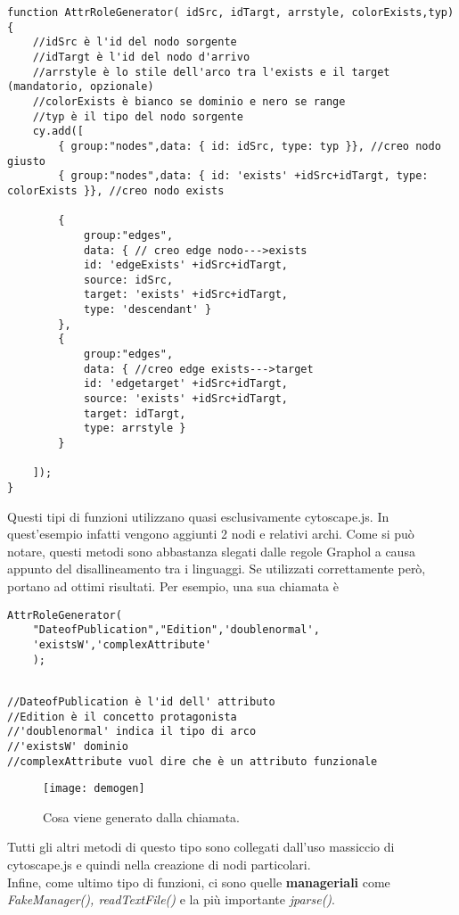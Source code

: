 \documentclass[Lau,binding=0.6cm]{sapthesis}
\begin{document}
\begin{verbatim}
function AttrRoleGenerator( idSrc, idTargt, arrstyle, colorExists,typ){ 
	//idSrc è l'id del nodo sorgente
	//idTargt è l'id del nodo d'arrivo
	//arrstyle è lo stile dell'arco tra l'exists e il target (mandatorio, opzionale)
	//colorExists è bianco se dominio e nero se range 
	//typ è il tipo del nodo sorgente
    cy.add([
        { group:"nodes",data: { id: idSrc, type: typ }}, //creo nodo giusto
        { group:"nodes",data: { id: 'exists' +idSrc+idTargt, type: colorExists }}, //creo nodo exists

        {   
            group:"edges",
            data: { // creo edge nodo--->exists
            id: 'edgeExists' +idSrc+idTargt, 
            source: idSrc,
            target: 'exists' +idSrc+idTargt,
            type: 'descendant' } 
        },
        { 
            group:"edges",                    
            data: { //creo edge exists--->target
            id: 'edgetarget' +idSrc+idTargt, 
            source: 'exists' +idSrc+idTargt,
            target: idTargt,
            type: arrstyle } 
        }

    ]);
}
\end{verbatim}
Questi tipi di funzioni utilizzano quasi esclusivamente cytoscape.js. In quest'esempio infatti vengono aggiunti 2 nodi e relativi archi. Come si può notare, questi metodi sono abbastanza slegati dalle regole Graphol a causa appunto del disallineamento tra i linguaggi. Se utilizzati correttamente però, portano ad ottimi risultati. Per esempio, una sua chiamata è
\begin{Verbatim}[tabsize=4]
AttrRoleGenerator(
	"DateofPublication","Edition",'doublenormal',
	'existsW','complexAttribute'
	);
\end{Verbatim}
\begin{verbatim}

//DateofPublication è l'id dell' attributo 
//Edition è il concetto protagonista
//'doublenormal' indica il tipo di arco
//'existsW' dominio
//complexAttribute vuol dire che è un attributo funzionale
\end{verbatim}
\begin{figure}[H]
\centering
\texttt{[image: demogen]}\\[3ex]
\caption{ Cosa viene generato dalla chiamata. }
\label{fig:largenenough}
\end{figure}
Tutti gli altri metodi di questo tipo sono collegati dall'uso massiccio di cytoscape.js e quindi nella creazione di nodi particolari.
\\Infine, come ultimo tipo di funzioni, ci sono quelle \textbf{manageriali} come \textit{FakeManager(), readTextFile()} e la più importante \textit{jparse()}.
\end{document}
